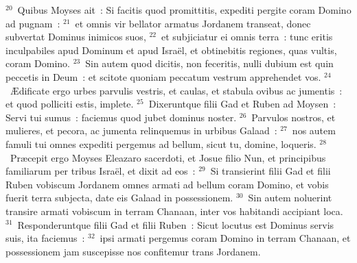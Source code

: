 ${}^{20}$~Quibus Moyses ait~: Si facitis quod promittitis, expediti pergite coram Domino ad pugnam~:
${}^{21}$~et omnis vir bellator armatus Jordanem transeat, donec subvertat Dominus inimicos suos,
${}^{22}$~et subjiciatur ei omnis terra~: tunc eritis inculpabiles apud Dominum et apud Isra\"el, et obtinebitis regiones, quas vultis, coram Domino.
${}^{23}$~Sin autem quod dicitis, non feceritis, nulli dubium est quin peccetis in Deum~: et scitote quoniam peccatum vestrum apprehendet vos.
${}^{24}$~\AE dificate ergo urbes parvulis vestris, et caulas, et stabula ovibus ac jumentis~: et quod polliciti estis, implete.
${}^{25}$~Dixeruntque filii Gad et Ruben ad Moysen~: Servi tui sumus~: faciemus quod jubet dominus noster.
${}^{26}$~Parvulos nostros, et mulieres, et pecora, ac jumenta relinquemus in urbibus Galaad~:
${}^{27}$~nos autem famuli tui omnes expediti pergemus ad bellum, sicut tu, domine, loqueris.
${}^{28}$~Pr\ae cepit ergo Moyses Eleazaro sacerdoti, et Josue filio Nun, et principibus familiarum per tribus Isra\"el, et dixit ad eos~:
${}^{29}$~Si transierint filii Gad et filii Ruben vobiscum Jordanem omnes armati ad bellum coram Domino, et vobis fuerit terra subjecta, date eis Galaad in possessionem.
${}^{30}$~Sin autem noluerint transire armati vobiscum in terram Chanaan, inter vos habitandi accipiant loca.
${}^{31}$~Responderuntque filii Gad et filii Ruben~: Sicut locutus est Dominus servis suis, ita faciemus~:
${}^{32}$~ipsi armati pergemus coram Domino in terram Chanaan, et possessionem jam suscepisse nos confitemur trans Jordanem.


